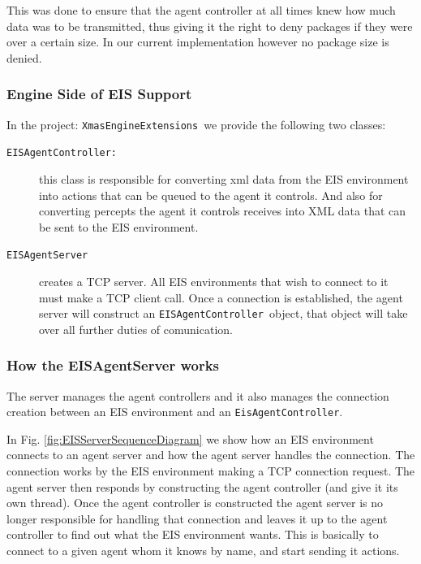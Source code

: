 This was done to ensure that the agent controller at all times knew
how much data was to be transmitted, thus giving it the right to deny
packages if they were over a certain size. In our current implementation
however no package size is denied. 


\subsubsection*{Engine Side of EIS Support}

In the project: \texttt{XmasEngineExtensions }we provide the following
two classes:
\begin{description}
\item [{\texttt{EISAgentController:}}] this class is responsible for converting
xml data from the EIS environment into actions that can be queued
to the agent it controls. And also for converting percepts the agent
it controls receives into XML data that can be sent to the EIS environment.
\item [{\texttt{EISAgentServer}}] creates a TCP server. All EIS environments
that wish to connect to it must make a TCP client call. Once a connection
is established, the agent server will construct an \texttt{EISAgentController
}object, that object will take over all further duties of comunication.
\end{description}

\subsubsection*{How the EISAgentServer works}

The server manages the agent controllers and it also manages the connection
creation between an EIS environment and an \texttt{EisAgentController}.

In Fig. \ref{fig:EISServerSequenceDiagram} we show how an EIS environment
connects to an agent server and how the agent server handles the connection.
The connection works by the EIS environment making a TCP connection
request. The agent server then responds by constructing the agent
controller (and give it its own thread). Once the agent controller
is constructed the agent server is no longer responsible for handling
that connection and leaves it up to the agent controller to find out
what the EIS environment wants. This is basically to connect to a
given agent whom it knows by name, and start sending it actions.


